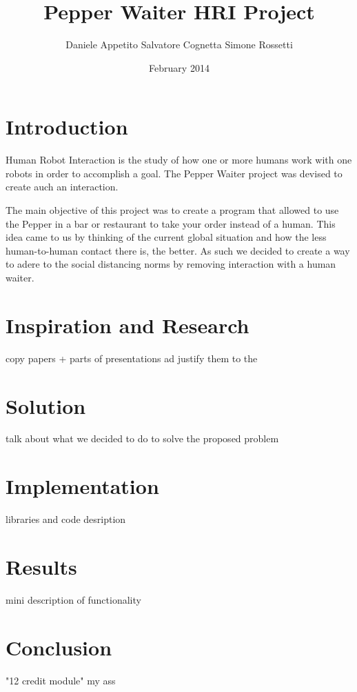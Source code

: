\documentclass[12pt, letterpaper, twoside]{article}
\title{Pepper Waiter HRI Project}
\author{Daniele Appetito Salvatore Cognetta Simone Rossetti}
\date{February 2014}
\begin{document}
\begin{titlepage}
\maketitle
\end{titlepage}

\tableofcontents
    

\section{Introduction}

Human Robot Interaction is the study of how one or more humans work with one robots in order to accomplish a goal. The Pepper Waiter project was devised to create auch an interaction. 

The main objective of this project was to create a program that allowed to use the Pepper in a bar or restaurant to take your order instead of a human. This idea came to us by thinking of the current global situation and how the less human-to-human contact there is, the better. As such we decided to create a way to adere to the social distancing norms by removing interaction with a human waiter. 

\section{Inspiration and Research}

copy papers + parts of presentations ad justify them to the 

\section{Solution}

talk about what we decided to do to solve the proposed problem

\section{Implementation}

libraries and code desription

\section{Results}

mini description of functionality

\section{Conclusion}

"12 credit module" my ass
\end{document}
